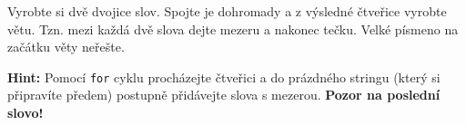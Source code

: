 \question[70]
Vyrobte si dvě dvojice slov. Spojte je dohromady a z výsledné čtveřice vyrobte
větu. Tzn. mezi každá dvě slova dejte mezeru a nakonec tečku. Velké písmeno na
začátku věty neřešte.

\textbf{Hint:} Pomocí \texttt{for} cyklu procházejte čtveřici a do prázdného
stringu (který si připravíte předem) postupně přidávejte slova s mezerou.
\textbf{Pozor na poslední slovo!}